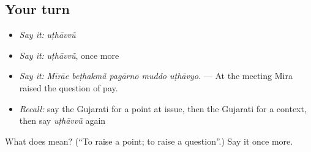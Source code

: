 \subsection*{Your turn}
\begin{itemize}
\raggedright
  \item \emph{Say it:} \emph{uṭhāvvũ}
  \item \emph{Say it:} \emph{uṭhāvvũ}, once more
  \item \emph{Say it:} \emph{Mīrāe beṭhakmā̃ pagārno muddo uṭhāvyo.} — At the meeting Mira raised the question of pay.
  \item \emph{Recall:} say the Gujarati for a point at issue, then the Gujarati for a context, then say \emph{uṭhāvvũ} again
\end{itemize}

\begin{tcolorbox}[breakable,colback=teal!4,colframe=teal!35!black,title={Before you move on}]
What does  mean? (\textquotedblleft{}To raise a point; to raise a question\textquotedblright{}.) Say it once more.
\end{tcolorbox}
